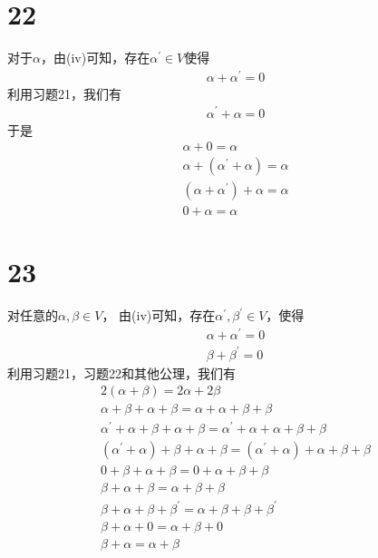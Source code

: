 \documentclass{article}
\begin{document}
\section*{22}
对于$\alpha$，由(iv)可知，存在$\alpha^\prime \in V$使得
\begin{align*}
  \alpha + \alpha^\prime = 0
\end{align*}
利用习题21，我们有
\begin{align*}
  \alpha^\prime + \alpha = 0
\end{align*}
于是
\begin{align*}
  \alpha + 0 = \alpha                        \\
  \alpha + (\alpha^\prime + \alpha) = \alpha \\
  (\alpha + \alpha^\prime) + \alpha = \alpha \\
  0 + \alpha = \alpha
\end{align*}

\section*{23}

对任意的$\alpha, \beta \in V$，
由(iv)可知，存在$\alpha^\prime, \beta^\prime \in V$，使得
\begin{align*}
  \alpha + \alpha^\prime = 0 \\
  \beta + \beta^\prime = 0
\end{align*}
利用习题21，习题22和其他公理，我们有
\begin{align*}
  2(\alpha + \beta) = 2\alpha + 2\beta                                                                  \\
  \alpha + \beta + \alpha + \beta = \alpha + \alpha + \beta + \beta                                     \\
  \alpha^\prime + \alpha + \beta + \alpha + \beta = \alpha^\prime + \alpha + \alpha + \beta + \beta     \\
  (\alpha^\prime + \alpha) + \beta + \alpha + \beta = (\alpha^\prime + \alpha) + \alpha + \beta + \beta \\
  0 + \beta + \alpha + \beta = 0 + \alpha + \beta + \beta                                               \\
  \beta + \alpha + \beta = \alpha + \beta + \beta                                                       \\
  \beta + \alpha + \beta + \beta^\prime = \alpha + \beta + \beta + \beta^\prime                         \\
  \beta + \alpha + 0 = \alpha + \beta + 0                                                               \\
  \beta + \alpha = \alpha + \beta
\end{align*}
\end{document}

